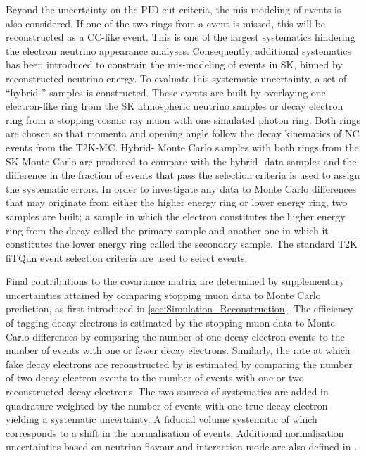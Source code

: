 Beyond the uncertainty on the PID cut criteria, the mis-modeling of  events is also considered. If one of the two rings from a  event is missed, this will be reconstructed as a CC-like event. This is one of the largest systematics hindering the electron neutrino appearance analyses. Consequently, additional systematics has been introduced to constrain the mis-modeling of  events in SK, binned by reconstructed neutrino energy. To evaluate this systematic uncertainty, a set of ``hybrid-'' samples is constructed. These events are built by overlaying one electron-like ring from the SK atmospheric neutrino samples or decay electron ring from a stopping cosmic ray muon with one simulated photon ring. Both rings are chosen so that momenta and opening angle follow the decay kinematics of NC  events from the T2K-MC. Hybrid- Monte Carlo samples with both rings from the SK Monte Carlo are produced to compare with the hybrid- data samples and the difference in the fraction of events that pass the  selection criteria is used to assign the systematic errors. In order to investigate any data to Monte Carlo differences that may originate from either the higher energy ring or lower energy ring, two samples are built; a sample in which the electron constitutes the higher energy ring from the  decay called the primary sample and another one in which it constitutes the lower energy ring called the secondary sample. The standard T2K  fiTQun event selection criteria are used to select events.

Final contributions to the covariance matrix are determined by supplementary uncertainties attained by comparing stopping muon data to Monte Carlo prediction, as first introduced in \autoref{sec:Simulation_Reconstruction}. The efficiency of tagging decay electrons is estimated by the stopping muon data to Monte Carlo differences by comparing the number of one decay electron events to the number of events with one or fewer decay electrons. Similarly, the rate at which fake decay electrons are reconstructed by \fq is estimated by comparing the number of two decay electron events to the number of events with one or two reconstructed decay electrons. The two sources of systematics are added in quadrature weighted by the number of events with one true decay electron yielding a  systematic uncertainty.
A fiducial volume systematic of  which corresponds to a  shift in the normalisation of events. Additional normalisation uncertainties based on neutrino flavour and interaction mode are also defined in \cite{t2k_tn_399, t2k_tn_186, t2k_tn_107}.

